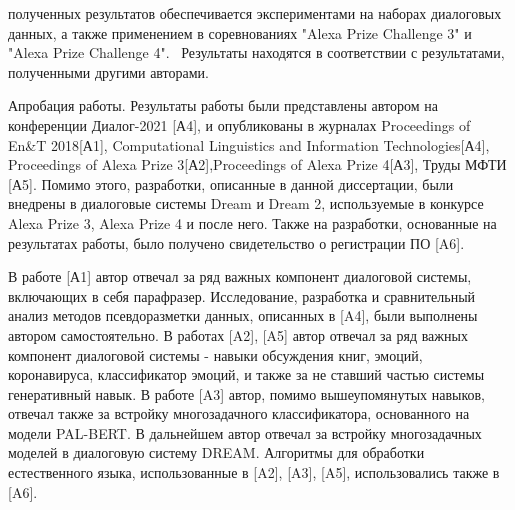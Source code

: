 {\reliability} полученных результатов обеспечивается экспериментами на наборах диалоговых данных, а также применением в соревнованиях "Alexa Prize Challenge 3" и "Alexa Prize Challenge 4". 
 \ Результаты находятся в соответствии с результатами, полученными другими авторами.


{\probation}
Апробация работы. Результаты работы были представлены автором на конференции Диалог-2021 [А4], и опубликованы в журналах Proceedings of En\&T 2018[А1], Computational Linguistics and Information Technologies[А4], Proceedings of Alexa Prize 3[А2],Proceedings of Alexa Prize 4[А3], Труды МФТИ [А5]. Помимо этого, разработки, описанные в данной диссертации, были внедрены в диалоговые системы Dream и Dream 2, используемые в конкурсе Alexa Prize 3, Alexa Prize 4 и после него. Также на разработки, основанные на результатах работы, было получено свидетельство о регистрации ПО [A6].


{\contribution} В работе [А1] автор отвечал за ряд важных компонент диалоговой системы, включающих в себя парафразер. Исследование, разработка и сравнительный анализ методов псевдоразметки данных, описанных в [A4], были выполнены автором самостоятельно. В работах [A2],  [A5] автор отвечал за ряд важных компонент диалоговой системы - навыки обсуждения книг, эмоций, коронавируса, классификатор эмоций, и также за не ставший частью системы генеративный навык. В работе [A3] автор, помимо вышеупомянутых навыков, отвечал также за встройку многозадачного классификатора, основанного на модели PAL-BERT. В дальнейшем автор отвечал за встройку многозадачных моделей в диалоговую систему DREAM. Алгоритмы для обработки естественного языка, использованные в [A2], [A3], [A5], использовались также в [A6]. 

